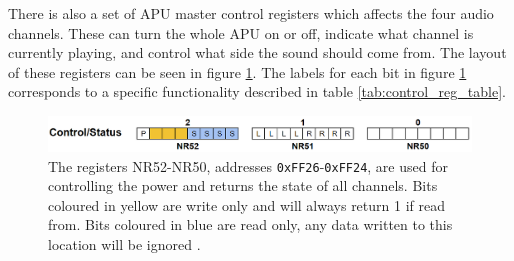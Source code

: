                 

There is also a set of APU master control registers which affects the four audio channels. These can turn the whole APU on or off, indicate what channel is currently playing, and control what side the sound should come from. The layout of these registers can be seen in figure \ref{fig:apu_master_control}. The labels for each bit in figure \ref{fig:apu_master_control} corresponds to a specific functionality described in table \ref{tab:control_reg_table}.

\begin{figure}[H]
    \centering
    \includegraphics[width=\linewidth]{figures/APU/master_control_apu.png}
    \caption{The registers NR52-NR50, addresses \texttt{0xFF26}-\texttt{0xFF24}, are used for controlling the power and returns the state of all channels. Bits coloured in yellow are write only and will always return 1 if read from. Bits coloured in blue are read only, any data written to this location will be ignored \cite{AudioHardware}.}
    \label{fig:apu_master_control}
\end{figure}

